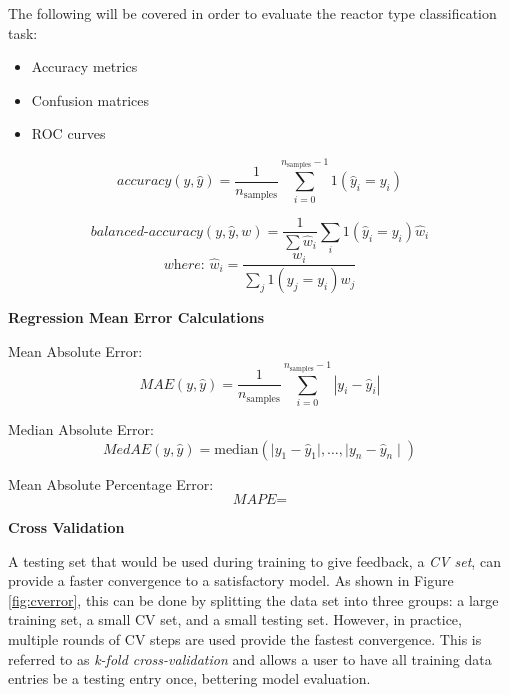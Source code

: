 The following will be covered in order to evaluate the reactor type
classification task:
\begin{itemize}
  \item Accuracy metrics
  \item Confusion matrices 
  \item \Gls{ROC} curves
\end{itemize}

\begin{equation}
  \textit{accuracy}(y, \hat{y}) = \frac{1}{n_\text{samples}} \sum_{i=0}^{n_\text{samples}-1} 1(\hat{y}_i = y_i)
\end{equation}

\begin{equation}
  \textit{balanced-accuracy}(y, \hat{y}, w) = \frac{1}{\sum{\hat{w}_i}} \sum_i 1(\hat{y}_i = y_i) \hat{w}_i
\end{equation}
\[ \textit{where: } \hat{w}_i = \frac{w_i}{\sum_j{1(y_j = y_i) w_j}} \]

\noindent \textbf{Regression Mean Error Calculations}

Mean Absolute Error:
\begin{equation}
  \textit{MAE}(y, \hat{y}) = \frac{1}{n_{\text{samples}}} \sum_{i=0}^{n_{\text{samples}}-1} \left| y_i - \hat{y}_i \right|
\end{equation}

Median Absolute Error:
\begin{equation}
  \textit{MedAE}(y, \hat{y}) = \text{median}(\mid y_1 - \hat{y}_1 \mid, \ldots, \mid y_n - \hat{y}_n \mid)
\end{equation}

Mean Absolute Percentage Error:
\begin{equation}
  \textit{MAPE} = 
\end{equation}

\noindent \textbf{Cross Validation}

A testing set that would be used during training to give feedback, a
\textit{\gls{CV} set}, can provide a faster convergence to a satisfactory
model. As shown in Figure \ref{fig:cverror}, this can be done by splitting the
data set into three groups: a large training set, a small \gls{CV} set, and a
small testing set.  However, in practice, multiple rounds of \gls{CV} steps are
used provide the fastest convergence.  This is referred to as \textit{k-fold
cross-validation} and allows a user to have all training data entries be a
testing entry once, bettering model evaluation. 

